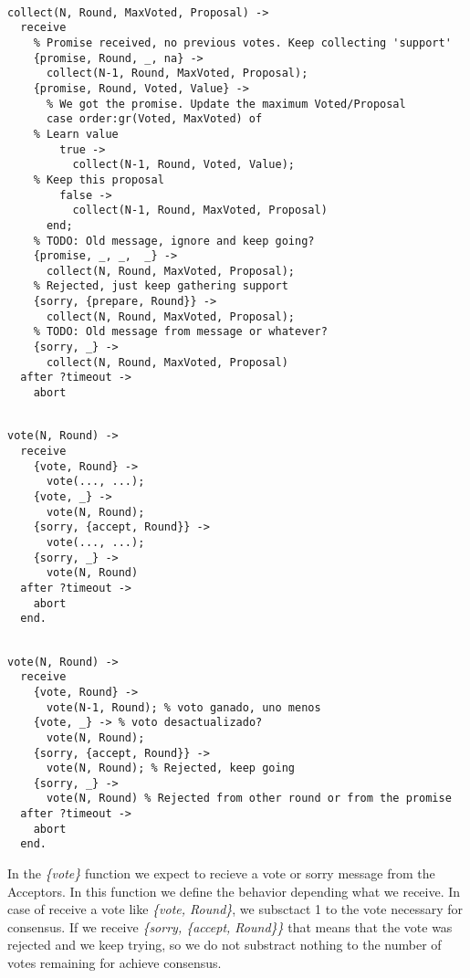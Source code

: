 \documentclass[a4paper, 10pt]{article}
\begin{document}
\begin{lstlisting}

collect(N, Round, MaxVoted, Proposal) ->
  receive 
    % Promise received, no previous votes. Keep collecting 'support'
    {promise, Round, _, na} ->
      collect(N-1, Round, MaxVoted, Proposal);
    {promise, Round, Voted, Value} ->
      % We got the promise. Update the maximum Voted/Proposal
      case order:gr(Voted, MaxVoted) of
	% Learn value
        true ->
          collect(N-1, Round, Voted, Value);
	% Keep this proposal
        false ->
          collect(N-1, Round, MaxVoted, Proposal)
      end;
    % TODO: Old message, ignore and keep going?
    {promise, _, _,  _} ->
      collect(N, Round, MaxVoted, Proposal);
    % Rejected, just keep gathering support
    {sorry, {prepare, Round}} ->
      collect(N, Round, MaxVoted, Proposal);
    % TODO: Old message from message or whatever?
    {sorry, _} ->
      collect(N, Round, MaxVoted, Proposal)
  after ?timeout ->
    abort
\end{lstlisting}


\begin{lstlisting}
  
vote(N, Round) ->
  receive
    {vote, Round} ->
      vote(..., ...);
    {vote, _} ->
      vote(N, Round);
    {sorry, {accept, Round}} ->
      vote(..., ...);
    {sorry, _} ->
      vote(N, Round)
  after ?timeout ->
    abort
  end.
\end{lstlisting}

\begin{lstlisting}

vote(N, Round) ->
  receive
    {vote, Round} ->
      vote(N-1, Round); % voto ganado, uno menos
    {vote, _} -> % voto desactualizado?
      vote(N, Round);
    {sorry, {accept, Round}} ->
      vote(N, Round); % Rejected, keep going
    {sorry, _} ->
      vote(N, Round) % Rejected from other round or from the promise
  after ?timeout ->
    abort
  end.
\end{lstlisting}

In the \textit{\{vote\}} function we expect to recieve a vote or sorry message from the Acceptors. In this function we define the behavior depending what we receive. In case of receive a vote like \textit{\{vote, Round\}}, we subsctact 1 to the vote necessary for consensus. If we receive \textit{\{sorry, \{accept, Round\}\}} that means that the vote was rejected and we keep trying, so we do not substract nothing to the number of votes remaining for achieve consensus.
\end{document}

